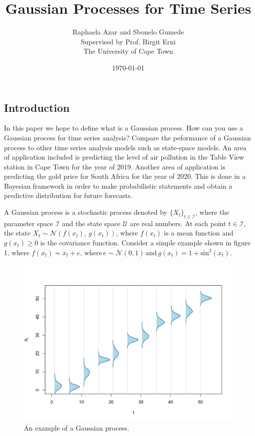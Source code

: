 \documentclass[a4paper, 10pt]{article}
\title{Gaussian Processes for Time Series}
\date{\today}
\author{Raphaela Azar and Sbonelo Gumede \\
Supervised by Prof. Birgit Erni\\
The University of Cape Town}
\begin{document}
   \maketitle

   \begin{flushleft}
   
   \section*{Introduction}

   In this paper we hope to define what is a Gaussian process. How can you use a Gaussian process for time series analysis? Compare the peformance of a Gaussian process to other time series analysis models such as state-space models. An area of application included is predicting the level of air pollution in the Table View station in Cape Town for the year of 2019. Another area of application is predicting the gold price for South Africa for the year of 2020. This is done in a Bayesian framework in order to make probabilistic statements and obtain a predictive distribution for future forecasts.

   \vspace{1em}

   A Gaussian process is a stochastic process denoted by $\{X_{t} \}_{t \in \mathcal{I}}$, where the parameter space $\mathcal{I}$ and the state space $\mathcal{U}$ are real numbers. 
   At each point $t \in \mathcal{I}$, the state $X_{t} \sim \mathcal{N}(f(x_{t}), \, g(x_{t}))$, where $f(x_{t})$ is a mean function and $g(x_{t}) \geq 0$ is the covariance function.  
   Consider a simple example shown in figure 1, where $f(x_{t}) = x_{t} + e, \, \text{where} \, e \sim \mathcal{N}(0, 1) \, \text{and} \, g(x_{t}) = 1 + \text{sin}^{2}(x_{t})$.
   
   \begin{figure}[H]
      \centering
      \includegraphics[width=0.48\linewidth]{../img/gp.png}
      \caption{An example of a Gaussian process.}
   \end{figure}
   

\end{flushleft}
\end{document}
